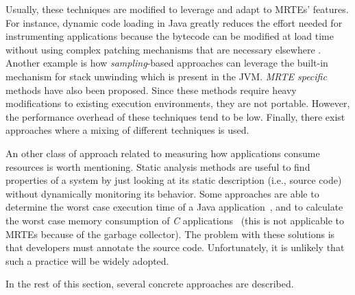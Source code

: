 Usually, these techniques are modified to leverage and adapt to MRTEs' features.
For instance, dynamic code loading in Java greatly reduces the effort needed for instrumenting applications because the bytecode can be modified at load time without using complex patching mechanisms that are necessary elsewhere \cite{Gregg:2011:DDT:1971960}.
Another example is how \textit{sampling}-based approaches can leverage the built-in mechanism for stack unwinding which is present in the JVM.
\textit{MRTE specific} methods have also been proposed.
Since these methods require heavy modifications to existing execution environments, they are not portable.
However, the performance overhead of these techniques tend to be low.
Finally, there exist approaches where a mixing of different techniques is used.

An other class of approach related to measuring how applications consume resources is worth mentioning.
Static analysis methods are useful to find properties of a system by just looking at its static description (i.e., source code) without dynamically monitoring its behavior.
Some approaches are able to determine the worst case execution time of a Java application~\cite{Schoeberl:2010:WET:1780354.1780356}, and to calculate the worst case memory consumption of \textit{C} applications~\cite{Puffitsch:2010:WAH:1939345.1939394} (this is not applicable to MRTEs because of the garbage collector).
The problem with these solutions is that developers must annotate the source code.
Unfortunately, it is unlikely that such a practice will be widely adopted.

In the rest of this section, several concrete approaches are described.


